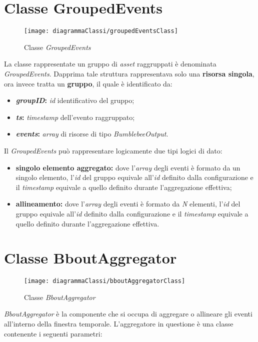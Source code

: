 \section{Classe GroupedEvents}\label{sec:ge}
\begin{figure}[H] 
    \centering 
    \texttt{[image: diagrammaClassi/groupedEventsClass]} 
    \caption{Classe \textit{GroupedEvents}}
\end{figure}
La classe rappresentate un gruppo di \textit{asset} raggruppati è denominata \textit{GroupedEvents}. Dapprima tale struttura rappresentava solo una \textbf{risorsa singola}, ora invece tratta un \textbf{gruppo}, il quale è identificato da:
\begin{itemize}
	\item{\textbf{\textit{groupID}:} \textit{id} identificativo del gruppo;}
	\item{\textbf{\textit{ts}:} \textit{\gls{timestamp}} dell'evento raggruppato;}
	\item{\textbf{\textit{events}:} \textit{array} di risorse di tipo \textit{BumblebeeOutput}.}
\end{itemize}
Il \textit{GroupedEvents} può rappresentare logicamente due tipi logici di dato:
\begin{itemize}
	\item{\textbf{singolo elemento aggregato:} dove l'\textit{array} degli eventi è formato da un singolo elemento, l'\textit{id} del gruppo equivale all'\textit{id} definito dalla configurazione e il \textit{\textit{\gls{timestamp}}} equivale a quello definito durante l'aggregazione effettiva;}
	\item{\textbf{allineamento:} dove l'\textit{array} degli eventi è formato da \textit{N} elementi, l'\textit{id} del gruppo equivale all'\textit{id} definito dalla configurazione e il \textit{\textit{\gls{timestamp}}} equivale a quello definito durante l'aggregazione effettiva.}
\end{itemize}

\section{Classe BboutAggregator}\label{sec:aggregator}
\begin{figure}[H] 
    \centering 
    \texttt{[image: diagrammaClassi/bboutAggregatorClass]} 
    \caption{Classe \textit{BboutAggregator}}
\end{figure}
\textit{BboutAggregator} è la componente che si occupa di aggregare o allineare gli eventi all'interno della finestra temporale. L'aggregatore in questione è una classe contenente i seguenti parametri:

